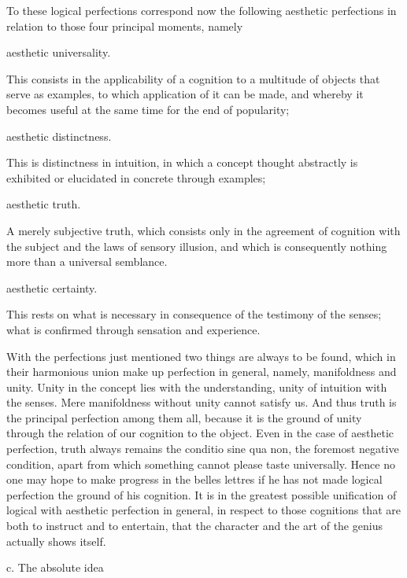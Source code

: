 To these logical perfections correspond now the following aesthetic
perfections in relation to those four principal moments, namely

aesthetic universality.

    This consists in the applicability of a cognition to a
    multitude of objects that serve as examples,
    to which application of it can be made,
    and whereby it becomes useful at the same time for the end of popularity;

aesthetic distinctness.

    This is distinctness in intuition, in which a concept
    thought abstractly is exhibited or elucidated in concrete through examples;

aesthetic truth.

    A merely subjective truth, which consists only in the agreement
    of cognition with the subject and the laws of sensory illusion,
    and which is consequently nothing more than a universal semblance.

aesthetic certainty.

    This rests on what is necessary in consequence of
    the testimony of the senses;
    what is confirmed through sensation and experience.

With the perfections just mentioned two things are always to be found,
which in their harmonious union make up perfection in general,
namely, manifoldness and unity.
Unity in the concept lies with the understanding,
unity of intuition with the senses.
Mere manifoldness without unity cannot satisfy us.
And thus truth is the principal perfection among them all,
because it is the ground of unity through
the relation of our cognition to the object.
Even in the case of aesthetic perfection,
truth always remains the conditio sine qua non,
the foremost negative condition,
apart from which something cannot please taste universally.
Hence no one may hope to make progress in the belles lettres
if he has not made logical perfection the ground of his cognition.
It is in the greatest possible unification of
logical with aesthetic perfection in general,
in respect to those cognitions that are both
to instruct and to entertain,
that the character and the art of
the genius actually shows itself.

c. The absolute idea
